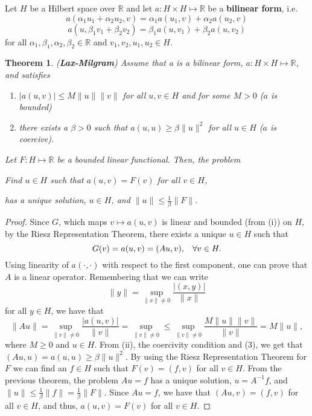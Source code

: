 \documentclass[12pt]{article}
\newtheorem{theorem}{Theorem}
\newcommand{\R}{{\mathbb R}}
\newcommand{\Ai}{A^{-1}}
\begin{document}
Let $H$ be a Hilbert space over $\R$ and let $a : H \times H \mapsto \R$ be a \textbf{bilinear form}, i.e.
\[ a(\alpha_1 u_1+ \alpha_2 u_2 , v) = \alpha_1 a(u_1, v) + \alpha_2 a(u_2, v)\]
\[ a(u, \beta_1 v_1 + \beta_2 v_2) = \beta_1 a(u, v_1) + \beta_2 a(u, v_2)\]
for all $\alpha_1, \beta_1, \alpha_2, \beta_2 \in \R$ and $v_1, v_2, u_1,u_2 \in H$. 
\begin{theorem}(\textbf{Lax-Milgram}) Assume that a is a bilinear form, $a: H \times H \mapsto \R$, and satisfies
\begin{enumerate}[topsep=-15pt, itemsep=0pt]
\item[(i)] $|a(u, v)| \leq M \| u \| \| v \|$ for all $u, v \in H$ and for some $M > 0$ ($a$ is bounded) 
\item[(ii)] there exists a $\beta  > 0$ such that $a(u, u) \geq \beta \| u \|^2$ for all $u \in H$ ($a$ is coercive). 
\end{enumerate}
Let $F: H \mapsto \R$ be a bounded linear functional. Then, the problem 
\begin{center}
\textit{Find $u \in H$ such that $a(u, v) = F(v)$ for all $v \in H$,}
\end{center}
has a unique solution, $u \in H$, and $\| u \| \leq \frac{1}{\beta} \| F \|$. 
\end{theorem}
\vspace{-20pt}
\begin{proof}
Since $G$, which maps $v \mapsto a(u, v)$ is linear and bounded (from (i)) on $H$, by the Riesz Representation Theorem, there exists a unique $u \in H$ such that 
\begin{equation}
G(v) = a(u, v) = (Au, v), \hspace{3mm} \forall v \in H.
\end{equation}
Using linearity of $a(\cdot, \cdot)$ with respect to the first component, one can prove that $A$ is a linear operator. Remembering that we can write 
\[ \| y \| = \sup\limits_{\| x \| \neq 0} \frac{|(x, y)|}{\| x \|}\]
for all $y \in H$, we have that 
\[ \| Au \| = \sup\limits_{\| v \| \neq 0} \frac{|a(u, v)|}{\| v \|} = \sup\limits_{\| v \| \neq 0} \leq \sup\limits_{\| v \| \neq 0} \frac{M \| u \| \| v \|}{\| v \|} = M \| u \|,\]
where $M \geq 0$ and $u \in H$. From (ii), the coercivity condition and (3), we get that $(Au, u) = a(u, u) \geq \beta \| u \|^2$. By using the Riesz Representation Theorem for $F$ we can find an $f \in H$ such that $F(v) = (f, v)$ for all $v \in H$. From the previous theorem, the problem $Au = f$ has a unique solution, $u = \Ai f$, and $\| u \| \leq \frac{1}{\beta} \| f\| = \frac{1}{\beta} \| F \|$. Since $Au = f$, we have that $(Au, v) = (f, v)$ for all $v \in H$, and thus, $a(u, v) = F(v)$ for all $v \in H$. 
\end{proof}
\end{document}
